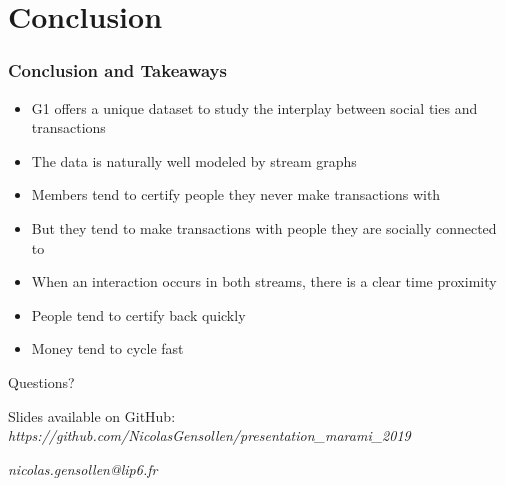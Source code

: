 \documentclass{beamer}
\begin{document}
\section{Conclusion}

\begin{frame}
	\frametitle{Conclusion and Takeaways}
	\begin{itemize}
		\item G1 offers a unique dataset to study the interplay between social ties and transactions
		\item The data is naturally well modeled by stream graphs
	\end{itemize}
	\medskip
	\begin{itemize}
		\item Members tend to certify people they never make transactions with
		\item But they tend to make transactions with people they are socially connected to
		\item When an interaction occurs in both streams, there is a clear time proximity
		\item People tend to certify back quickly
		\item Money tend to cycle fast
	\end{itemize}
\end{frame}


\begin{frame}
	\Huge{\centerline{Questions?}}
	\bigskip
	{\normalsize Slides available on GitHub: \\ \textit{https://github.com/NicolasGensollen/presentation\_marami\_2019}}
	\bigskip	
	\begin{center}
	{\normalsize \textit{nicolas.gensollen@lip6.fr}}
	\end{center}
\end{frame}

\end{document}
